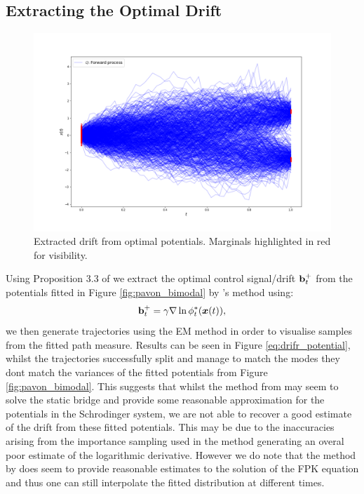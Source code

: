 \documentclass[a4paper,12pt,twoside,openright]{report}
\theoremstyle{definition}
\begin{document}
\subsection{Extracting the Optimal Drift}
\begin{figure}[t]
    \centering
    \includegraphics[scale=0.45,trim={4.3cm 1cm 2.5cm 0}, clip]{images/Pavon/pavon_trajectories_bimodal.png} 
    \caption{Extracted drift from optimal potentials. Marginals highlighted in red for visibility. }
    \label{fig:pavon_bimodal_drift}
\end{figure}
Using Proposition 3.3 of \cite{pavon1991free} we extract the optimal control signal/drift ${\mathbf{b}}_t^+$ from the potentials fitted in Figure \ref{fig:pavon_bimodal} by \cite{pavon2018data}'s method using: 
\begin{align*} 
    {\mathbf{b}}_t^{+} = \gamma \nabla \ln \phi^*_t({\bm{x}}(t) ),
\end{align*}
we then generate trajectories using the EM method in order to visualise samples from the fitted path measure. Results can be seen in Figure \ref{eq:drifr_potential}, whilst the trajectories successfully split and manage to match the modes they dont match the variances of the fitted potentials from Figure \ref{fig:pavon_bimodal}. This suggests that whilst the method from \cite{pavon2018data} may seem to solve the static bridge and provide some reasonable approximation for the potentials in the Schrodinger system, we are not able to recover a good estimate of the drift from these fitted potentials. This may be due to the inaccuracies arising from the importance sampling used in the method generating an overal poor estimate of the logarithmic derivative. However we do note that the method by \cite{pavon1991free} does seem to provide reasonable estimates to the solution of the FPK equation and thus one can still interpolate the fitted distribution at different times.
\end{document}
